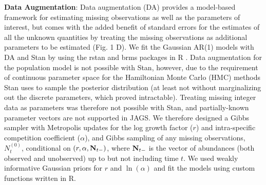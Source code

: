 \documentclass[12pt,english]{article} %
\begin{document}
\textbf{Data Augmentation}: Data augmentation (DA) provides a model-based framework for estimating missing observations as well as the parameters of interest, but comes with the added benefit of standard errors for the estimates of all the unknown quantities by treating the missing observations as additional parameters to be estimated (Fig. 1 D). We fit the Gaussian AR(1) models with DA and Stan \citep{carpenter_stan_2017} by using the rstan \citep{rstan_package} and brms \citep{burkner2017brms} packages in R \citep{r_2021}. Data augmentation for the population model is not possible with Stan, however, due to the requirement of continuous parameter space for the Hamiltonian Monte Carlo (HMC) methods Stan uses to sample the posterior distribution (at least not without marginalizing out the discrete parameters, which proved intractable). Treating missing integer data as parameters was therefore not possible with Stan, and partially-known parameter vectors are not supported in JAGS. We therefore designed a Gibbs sampler with Metropolis updates for the log growth factor ($r$) and intra-specific competition coefficient ($\alpha$), and Gibbs sampling of any missing observations, $N_{t}^{(0)}$, conditional on $(r, \alpha, {\bf N}_{t-})$, where ${\bf N}_{t-}$ is the vector of abundances (both observed and unobserved) up to but not including time $t$. We used weakly informative Gaussian priors for $r$ and $\ln(\alpha)$ and fit the models using custom functions written in R. 


\printbibliography

%
%
\end{document}
